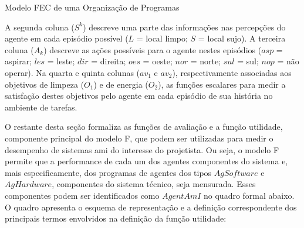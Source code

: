 \begin{section}{Modelo FEC de uma Organização de Programas}
    \begin{table}[h!]   
        \centering
    \end{table}
        
    A segunda coluna ($S^k$) descreve uma parte das informações nas percepções do agente em cada episódio possível ($L$ = local limpo; $S$ = local sujo). A terceira coluna ($A_k$) descreve as ações possíveis para o agente nestes episódios ($asp$ = aspirar; $les$ = leste; $dir$ = direita; $oes$ = oeste; $nor$ = norte; $sul$ = sul; $nop$ = não operar). Na quarta e quinta colunas ($av_1$ e $av_2$), respectivamente associadas aos objetivos de limpeza ($O_1$) e de energia ($O_2$), as funções escalares para medir a satisfação destes objetivos pelo agente em cada episódio de sua história no ambiente de tarefas. 
    
    O restante desta seção formaliza as funções de avaliação e a função utilidade, componente principal do modelo F, que podem ser utilizadas para medir o desempenho de sistemas \acrshort{ami} do interesse do projetista. Ou seja, o modelo F permite que a performance de cada um dos agentes componentes do sistema e, mais especificamente, dos programas de agentes dos tipos $AgSoftware$ e $AgHardware$, componentes do sistema técnico, seja mensurada. Esses componentes podem ser identificados como $AgentAmI$ no quadro  formal abaixo. O quadro apresenta o esquema de representação e a definição correspondente dos principais termos envolvidos na definição da função utilidade:
    

\end{section}
